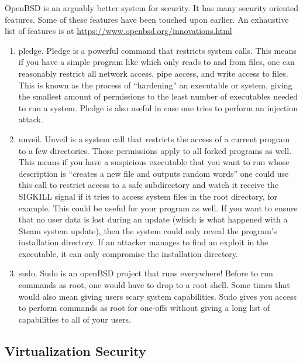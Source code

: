 OpenBSD is an arguably better system for security.
It has many security oriented features.
Some of these features have been touched upon earlier.
An exhaustive list of features is at \url{https://www.openbsd.org/innovations.html}

\begin{enumerate}
\item pledge.
  Pledge is a powerful command that restricts system calls.
  This means if you have a simple program like  which only reads to and from files, one can reasonably restrict all network access, pipe access, and write access to files.
  This is known as the process of ``hardening'' an executable or system, giving the smallest amount of permissions to the least number of executables needed to run a system.
  Pledge is also useful in case one tries to perform an injection attack.
\item unveil.
  Unveil is a system call that restricts the access of a current program to a few directories.
  Those permissions apply to all forked programs as well.
  This means if you have a suspicious executable that you want to run whose description is ``creates a new file and outputs random words'' one could use this call to restrict access to a safe subdirectory and watch it receive the SIGKILL signal if it tries to access system files in the root directory, for example.
  This could be useful for your program as well.
  If you want to ensure that no user data is lost during an update (which is what happened with a Steam system update), then the system could only reveal the program's installation directory.
  If an attacker manages to find an exploit in the executable, it can only compromise the installation directory.
\item sudo.
  Sudo is an openBSD project that runs everywhere!
  Before to run commands as root, one would have to drop to a root shell.
  Some times that would also mean giving users scary system capabilities.
  Sudo gives you access to perform commands as root for one-offs without giving a long list of capabilities to all of your users.
\end{enumerate}

\subsection{Virtualization Security}

